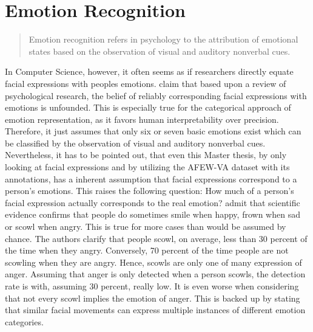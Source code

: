 \section{Emotion Recognition}
\begin{quote}
    Emotion recognition refers in psychology to the attribution of emotional states based on the observation of visual and auditory nonverbal cues. \citep{Baenziger:2014:MeasuringERAbility}
\end{quote}
In Computer Science, however, it often seems as if researchers directly equate facial expressions with peoples emotions. \citet{Barrett:2019:EmotionalFromFacialMovements} claim that based upon a review of psychological research, the belief of reliably corresponding facial expressions with emotions is unfounded. This is especially true for the categorical approach of emotion representation, as it favors human interpretability over precision. Therefore, it just assumes that only six or seven basic emotions exist which can be classified by the observation of visual and auditory nonverbal cues.
\newline\newline
Nevertheless, it has to be pointed out, that even this Master thesis, by only looking at facial expressions and by utilizing the AFEW-VA dataset with its annotations, has a inherent assumption that facial expressions correspond to a person's emotions.\newline
This raises the following question: How much of a person's facial expression actually corresponds to the real emotion?
\newline\newline
\citet{Barrett:2019:EmotionalFromFacialMovements} admit that scientific evidence confirms that people do sometimes smile when happy, frown when sad or scowl when angry. This is true for more cases than would be assumed by chance. The authors clarify that people scowl, on average, less than 30 percent of the time when they angry. Conversely, 70 percent of the time people are not scowling when they are angry. Hence, scowls are only one of many expression of anger. Assuming that anger is only detected when a person scowls, the detection rate is with, assuming 30 percent, really low. It is even worse when considering that not every scowl implies the emotion of anger. This is backed up by \citet{Barrett:2019:EmotionalFromFacialMovements} stating that similar facial movements can express multiple instances of different emotion categories.
